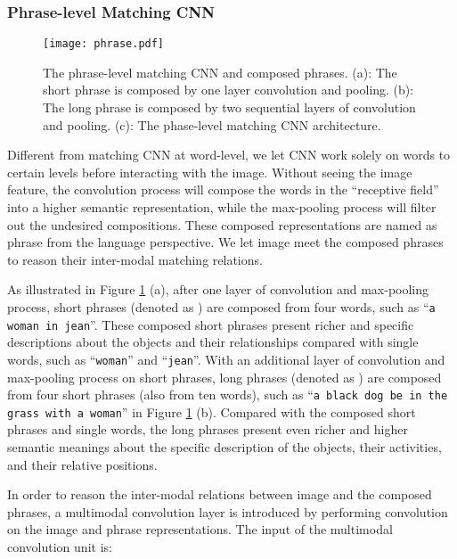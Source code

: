 \documentclass[10pt,twocolumn,letterpaper]{article}
\begin{document}
\subsubsection{Phrase-level Matching CNN}
\begin{figure}[t!]
\begin{center}
\texttt{[image: phrase.pdf]}

\end{center}
   \caption{The phrase-level matching CNN and composed phrases. (a): The short phrase is composed by one layer convolution and pooling. (b): The long phrase is composed by two sequential layers of convolution and pooling. (c): The phase-level matching CNN architecture.}
\label{fig:phrase}

\end{figure}

Different from matching CNN at word-level, we let CNN work solely on words to certain levels before interacting with the image.  Without seeing the image feature, the convolution process will compose the words in the ``receptive field'' into a higher semantic representation, while the max-pooling process will filter out the undesired compositions. These composed representations are named as phrase from the language perspective. We let image meet the composed phrases to reason their inter-modal matching relations.


As  illustrated in Figure \ref{fig:phrase} (a), after one layer of convolution and max-pooling process, short phrases (denoted as ) are composed from four words, such as ``\texttt{\small a woman in jean}''. These composed short phrases present richer and specific descriptions about the objects and their relationships compared with single words, such as ``\texttt{\small woman}'' and ``\texttt{\small jean}''. With an additional layer of convolution and max-pooling process on short phrases, long phrases (denoted as ) are composed from four short phrases (also from ten words), such as ``\texttt{\small a black dog be in the grass with a woman}'' in Figure \ref{fig:phrase} (b). Compared with the composed short phrases and single words, the long phrases present even richer and higher semantic meanings about the specific description of the objects, their activities, and their relative positions.


In order to reason the inter-modal relations between image and the composed phrases, a multimodal convolution layer is introduced by performing convolution on the image and phrase representations. The input of the multimodal convolution unit is:
\end{document}
